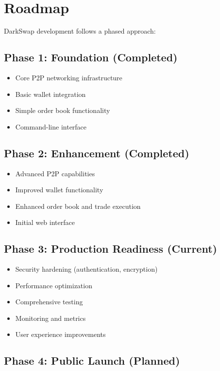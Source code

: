\documentclass[11pt,a4paper]{article}
\begin{document}
\section{Roadmap}

DarkSwap development follows a phased approach:

\subsection{Phase 1: Foundation (Completed)}

\begin{itemize}
    \item Core P2P networking infrastructure
    \item Basic wallet integration
    \item Simple order book functionality
    \item Command-line interface
\end{itemize}

\subsection{Phase 2: Enhancement (Completed)}

\begin{itemize}
    \item Advanced P2P capabilities
    \item Improved wallet functionality
    \item Enhanced order book and trade execution
    \item Initial web interface
\end{itemize}

\subsection{Phase 3: Production Readiness (Current)}

\begin{itemize}
    \item Security hardening (authentication, encryption)
    \item Performance optimization
    \item Comprehensive testing
    \item Monitoring and metrics
    \item User experience improvements
\end{itemize}

\subsection{Phase 4: Public Launch (Planned)}
\end{document}
